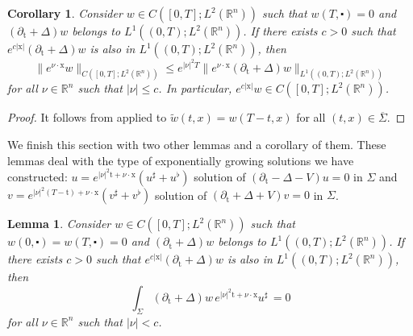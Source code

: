 \documentclass[10pt,a4paper]{amsart}
\newtheorem{corollary}[proposition]{Corollary}
\newtheorem{lemma}[proposition]{Lemma}
\newcommand{\R}{\mathbb{R}}
\newcommand{\tm}{\mathrm{t}}
\newcommand{\x}{\mathrm{x}}
\begin{document}
\begin{corollary}\label{cor:propag_decay}\sl Consider $w \in C([0, T] ; L^{2}(\mathbb{R}^{n}))$ such that 
$w(T, \centerdot)=0$ 
and $(\partial_{\tm}+\Delta)w $ belongs to $ L^{1}((0, T) ; L^{2}(\mathbb{R}^{n}))$.
If there exists $c > 0$ such that 
$e^{c|\x|} (\partial_{\tm}+\Delta)w $ is also in $ L^{1}((0, T) ; L^{2}(\mathbb{R}^{n}))$, then
\[ \|e^{\nu \cdot \x} w\|_{C([0, T] ; L^{2}(\mathbb{R}^{n}))} \leq e^{|\nu|^2 T} \|e^{\nu \cdot \x} (\partial_{\tm}+\Delta)w\|_{L^{1}((0, T) ; L^{2}(\mathbb{R}^{n}))} \]
for all $\nu \in \R^n$ such that $|\nu| \leq c$. In particular, $e^{c|\x|} w \in C([0, T] ; L^{2}(\mathbb{R}^{n}))$.
\end{corollary}

\begin{proof}
It follows from  applied to $\tilde w (t, x) = w (T-t, x) $ for all
$(t, x) \in \overline{\Sigma}$.
\end{proof}

We finish this section with two other lemmas and a corollary of them. These lemmas deal with the
type of exponentially growing solutions we have constructed: $u = e^{|\nu|^2 \tm + \nu \cdot \x} (u^\sharp + u^\flat)$ solution of $(\partial_\tm - \Delta - V) u = 0$ in $\Sigma$ and 
$v = e^{|\nu|^2 (T - \tm) + \nu \cdot \x} (v^\sharp + v^\flat)$ solution of 
$(\partial_\tm + \Delta + V) v = 0$ in $\Sigma$.


\begin{lemma}\label{lem:usharp}\sl
Consider $w \in C([0, T] ; L^{2}(\mathbb{R}^{n}))$ such that 
$w (0, \centerdot) = w(T, \centerdot)=0$ 
and $(\partial_{\tm}+\Delta)w $ belongs to $ L^{1}((0, T) ; L^{2}(\mathbb{R}^{n}))$.
If there exists $c > 0$ such that 
$e^{c|\x|} (\partial_{\tm}+\Delta)w $ is also in $ L^{1}((0, T) ; L^{2}(\mathbb{R}^{n}))$, then
\[\int_{\Sigma}( \partial_{\tm}+\Delta) w \, e^{|\nu|^2 \tm + \nu \cdot \x} u^\sharp \, = 0 \]
for all $\nu \in \R^n$ such that $|\nu| < c$.
\end{lemma}
\end{document}
